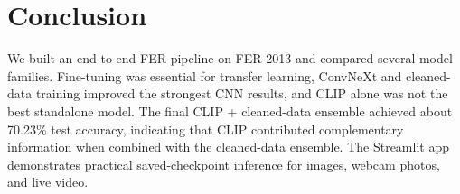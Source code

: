 \documentclass{article}
\begin{document}
\section{Conclusion}

We built an end-to-end FER pipeline on FER-2013 and compared several model families. Fine-tuning was essential for transfer learning, ConvNeXt and cleaned-data training improved the strongest CNN results, and CLIP alone was not the best standalone model. The final CLIP + cleaned-data ensemble achieved about 70.23\% test accuracy, indicating that CLIP contributed complementary information when combined with the cleaned-data ensemble. The Streamlit app demonstrates practical saved-checkpoint inference for images, webcam photos, and live video.



\end{document}
